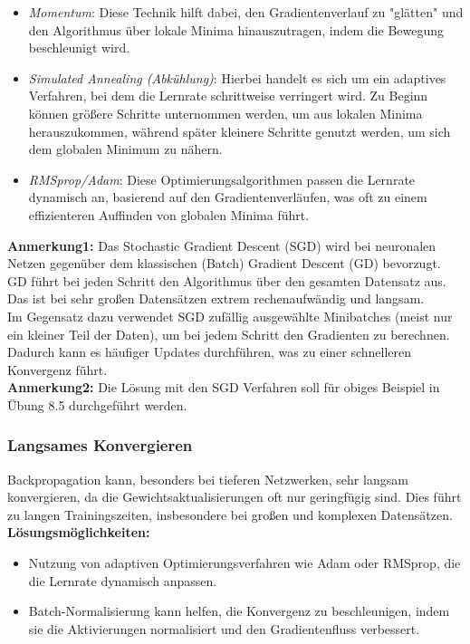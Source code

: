 \documentclass[12pt]{article}
\begin{document}
\begin{itemize}
    \item \textit{Momentum}: Diese Technik hilft dabei, den Gradientenverlauf zu "glätten" und den Algorithmus über lokale Minima hinauszutragen, indem die Bewegung beschleunigt wird.
    
    \item \textit{Simulated Annealing (Abkühlung)}: Hierbei handelt es sich um ein adaptives Verfahren, bei dem die Lernrate schrittweise verringert wird. Zu Beginn können größere Schritte unternommen werden, um aus lokalen Minima herauszukommen, während später kleinere Schritte genutzt werden, um sich dem globalen Minimum zu nähern.
    
    \item \textit{RMSprop/Adam}: Diese Optimierungsalgorithmen passen die Lernrate dynamisch an, basierend auf den Gradientenverläufen, was oft zu einem effizienteren Auffinden von globalen Minima führt.
\end{itemize}
%
\textbf{Anmerkung1:} Das Stochastic Gradient Descent (SGD) wird bei neuronalen Netzen gegenüber dem klassischen (Batch) Gradient Descent (GD) bevorzugt. \\
GD führt bei jeden Schritt den Algorithmus über den gesamten Datensatz aus. Das ist bei sehr großen Datensätzen extrem rechenaufwändig und langsam. \\
Im Gegensatz dazu verwendet SGD zufällig ausgewählte Minibatches (meist nur ein kleiner Teil der Daten), um bei jedem Schritt den Gradienten zu berechnen. Dadurch kann es häufiger Updates durchführen, was zu einer schnelleren Konvergenz führt.\\[0.3cm]
%
\textbf{Anmerkung2:} Die Lösung mit den SGD Verfahren soll für obiges Beispiel in Übung 8.5 durchgeführt werden.
\subsubsection{Langsames Konvergieren}

Backpropagation kann, besonders bei tieferen Netzwerken, sehr langsam konvergieren, da die Gewichtsaktualisierungen oft nur geringfügig sind. Dies führt zu langen Trainingszeiten, insbesondere bei großen und komplexen Datensätzen.\\

\textbf{Lösungsmöglichkeiten:}
\begin{itemize}
    \item Nutzung von adaptiven Optimierungsverfahren wie Adam oder RMSprop, die die Lernrate dynamisch anpassen.
    \item Batch-Normalisierung kann helfen, die Konvergenz zu beschleunigen, indem sie die Aktivierungen normalisiert und den Gradientenfluss verbessert.
\end{itemize}
%
\end{document}
